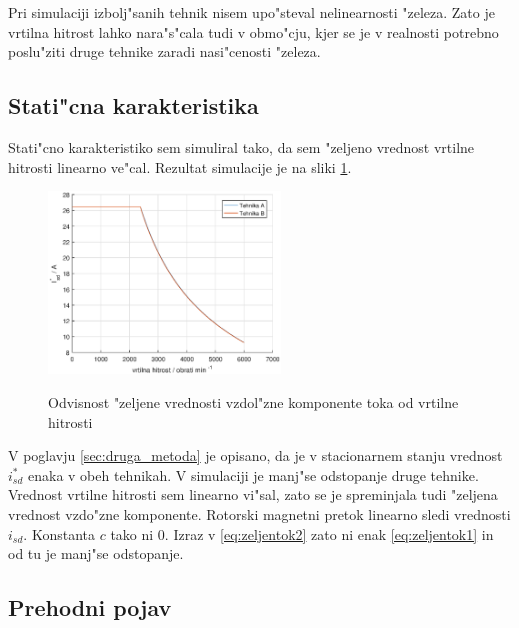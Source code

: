 \documentclass[journal,a4paper,twoside]{sty/IEEEtran}
\begin{document}
Pri simulaciji izbolj"sanih tehnik nisem upo"steval nelinearnosti "zeleza. Zato je vrtilna hitrost lahko nara"s"cala tudi v obmo"cju, kjer se je v realnosti potrebno poslu"ziti druge tehnike zaradi nasi"cenosti "zeleza.

\subsection{Stati"cna karakteristika}

Stati"cno karakteristiko sem simuliral tako, da sem "zeljeno vrednost vrtilne hitrosti linearno ve"cal. Rezultat simulacije je na sliki \ref{fig:static}.

\begin{figure}
\includegraphics[width=0.55\textwidth]{fig_static.eps}
\label{fig:static}
\caption{Odvisnost "zeljene vrednosti vzdol"zne komponente toka od vrtilne hitrosti}
\end{figure}

V poglavju \ref{sec:druga_metoda} je opisano, da je v stacionarnem stanju vrednost $i_{sd}^*$ enaka v obeh tehnikah. V simulaciji je manj"se odstopanje druge tehnike. Vrednost vrtilne hitrosti sem linearno vi"sal, zato se je spreminjala tudi "zeljena vrednost vzdo"zne komponente. Rotorski magnetni pretok  linearno sledi vrednosti $i_{sd}$. Konstanta $c$ tako ni 0. Izraz v \ref{eq:zeljentok2} zato ni enak \ref{eq:zeljentok1} in od tu je manj"se odstopanje.

\subsection{Prehodni pojav}
\end{document}
